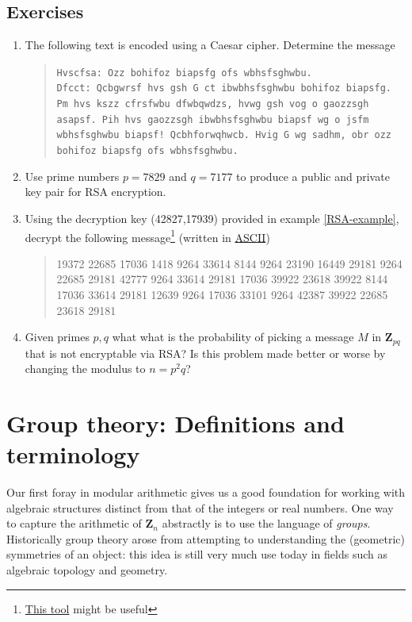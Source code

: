 \documentclass[12pt]{article}
\numberwithin{equation}{subsection}
\theoremstyle{note}
\begin{document}
\subsection{Exercises}\label{RSA-ex}
\begin{enumerate}[label=\arabic*.]
\item The following text is encoded using a Caesar cipher. Determine the message
\begin{quote}
	\texttt{Hvscfsa: Ozz bohifoz biapsfg ofs wbhsfsghwbu. \\
	Dfcct: Qcbgwrsf hvs gsh G ct ibwbhsfsghwbu bohifoz biapsfg. Pm hvs kszz cfrsfwbu dfwbqwdzs, hvwg gsh vog o gaozzsgh asapsf. Pih hvs gaozzsgh ibwbhsfsghwbu biapsf wg o jsfm wbhsfsghwbu biapsf! Qcbhforwqhwcb. Hvig G wg sadhm, obr ozz bohifoz biapsfg ofs wbhsfsghwbu.}
\end{quote}
\item Use prime numbers $p=7829$ and $q=7177$ to produce a public and private key pair for RSA encryption.
\item Using the decryption key (42827,17939) provided in example \ref{RSA-example}, decrypt the following message\footnote{\href{https://www.boxentriq.com/code-breaking/modular-exponentiation}{This tool} might be useful} (written in \href{https://www.cs.cmu.edu/~pattis/15-1XX/common/handouts/ascii.html}{ASCII})\begin{quote} 
19372 22685 17036 1418 9264 33614 8144 9264 23190 16449 29181 9264 22685 29181 42777 9264 33614 29181 17036 39922 23618 39922 8144 17036 33614 29181 12639 9264 17036 33101 9264 42387 39922 22685 23618 29181 
\end{quote}

\item \label{prob-RSA} Given primes $p,q$ what what is the probability of picking a message $M$ in $\mathbf{Z}_{pq}$ that is not encryptable via RSA? Is this problem made better or worse by changing the modulus to $n=p^2q$?
\end{enumerate}




\section[Group theory]{Group theory: Definitions and terminology}
	Our first foray in modular arithmetic gives us a good foundation for working with algebraic structures distinct from that of the integers or real numbers. One way to capture the arithmetic of $\mathbf{Z}_n$ abstractly is to use the language of \textit{groups}. Historically group theory arose from attempting to understanding the (geometric) symmetries of an object: this idea is still very much use today in fields such as algebraic topology and geometry.
\end{document}
